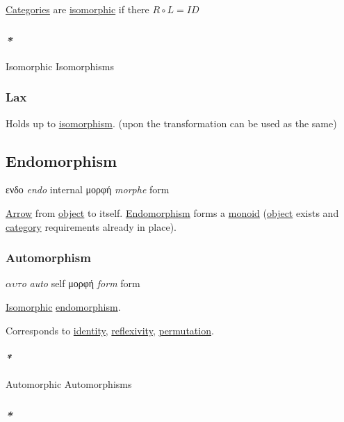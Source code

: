 \documentclass[a4paper,14pt,oneside]{book}
\begin{document}
\hyperref[org8f1742b]{Categories} are \hyperref[orgf869e5b]{isomorphic} if there \(R \circ L = ID\)

\subsubsection{\emph{*}}
\label{sec:org3b3d4fb}

\label{orgf869e5b}Isomorphic
\label{orgfe5d40b}Isomorphisms

\subsubsection{\label{org15a15b0}Lax}
\label{sec:org2423aa2}
Holds up to \hyperref[orga2e14b8]{isomorphism}.
(upon the transformation can be used as the same)

\subsection{\label{org9a1dda1}Endomorphism}
\label{sec:org9a70359}
ενδο \emph{endo} internal
μορφή \emph{morphe} form

\hyperref[org0b51b24]{Arrow} from \hyperref[org8d6cd26]{object} to itself.
\hyperref[org9a1dda1]{Endomorphism} forms a \hyperref[org9e1ff1f]{monoid} (\hyperref[org8d6cd26]{object} exists and \hyperref[org82baa03]{category} requirements already in place).

\subsubsection{\label{orgdd7a986}Automorphism}
\label{sec:orged799fc}
\(\alpha \upsilon \tau\)\textit{o} \emph{auto} self
μορφή \emph{form} form

\hyperref[orgf869e5b]{Isomorphic} \hyperref[org9a1dda1]{endomorphism}.

Corresponds to \hyperref[org5f89edb]{identity}, \hyperref[org647fba0]{reflexivity}, \hyperref[orga4a2063]{permutation}.

\paragraph{\emph{*}}
\label{sec:orga16d0c7}

\label{org2ba6049}Automorphic
\label{org4f8c759}Automorphisms

\subsubsection{\emph{*}}
\label{sec:org1ee10f7}
\end{document}
